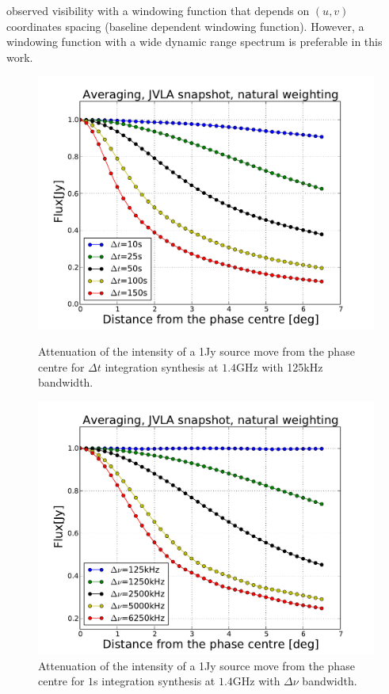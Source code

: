 \documentclass[useAMS,usenatbib]{mn2e}
\begin{document}
observed visibility with a  windowing function that depends on $(u,v)$ coordinates spacing (baseline dependent windowing function). 
However, a windowing function with a wide dynamic range spectrum is preferable in this work.
\begin{figure}
  \centering
  \begin{minipage}{0.38\linewidth}\includegraphics[width=1\textwidth]{./Figures/effect_time_averaging.pdf}\caption{Attenuation of the 
intensity of a 1Jy source move from the phase centre for $\Delta t$ integration synthesis at $1.4$GHz with
125kHz bandwidth.}\label{timessear1}\end{minipage}
\hspace{1cm}
\begin{minipage}{0.38\linewidth}\includegraphics[width=1\textwidth]{./Figures/effect_bandwid_averaging.pdf}\caption{Attenuation of the 
intensity of a 1Jy source move from the phase centre for $1$s integration synthesis at $1.4$GHz with
$\Delta \nu$ bandwidth.}\label{timessear2}\end{minipage}
\end{figure}
\end{document}

